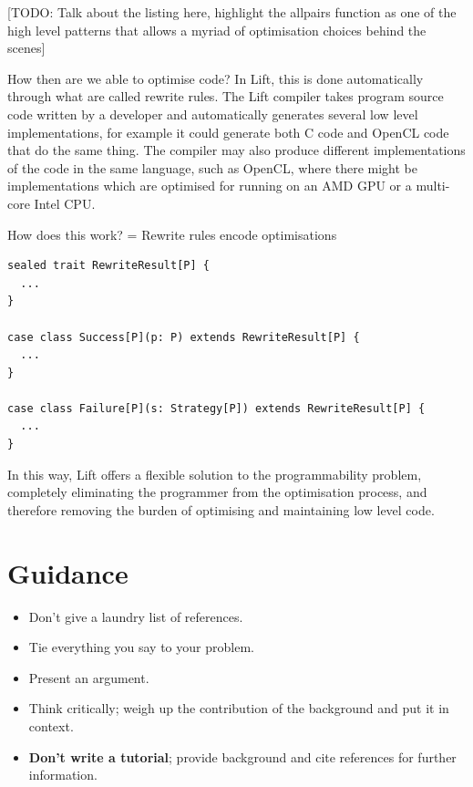 \documentclass{l4proj}
\begin{document}
[TODO: Talk about the listing here, highlight the allpairs function as one of the high level patterns that allows a myriad of optimisation choices behind the scenes]

How then are we able to optimise code? In Lift, this is done automatically through what are called rewrite rules. The Lift compiler takes program source code written by a developer and automatically generates several low level implementations, for example it could generate both C code and OpenCL code that do the same thing. The compiler may also produce different implementations of the code in the same language, such as OpenCL, where there might be implementations which are optimised for running on an AMD GPU or a multi-core Intel CPU.

How does this work? = Rewrite rules encode optimisations


\begin{lstlisting}[caption={The RewriteResult trait definition taken directly from Lift (omitted are functions for retrieving value from the wrapper object, not used in this project)}]
sealed trait RewriteResult[P] {
  ...
}

case class Success[P](p: P) extends RewriteResult[P] {
  ...
}

case class Failure[P](s: Strategy[P]) extends RewriteResult[P] {
  ...
}
\end{lstlisting}




In this way, Lift offers a flexible solution to the programmability problem, completely eliminating the programmer from the optimisation process, and therefore removing the burden of optimising and maintaining low level code. 

\section{Guidance}
\begin{itemize}    
    \item
      Don't give a laundry list of references.
    \item
      Tie everything you say to your problem.
    \item
      Present an argument.
    \item Think critically; weigh up the contribution of the background and put it in context.    
    \item
      \textbf{Don't write a tutorial}; provide background and cite
      references for further information.
\end{itemize}
\end{document}
